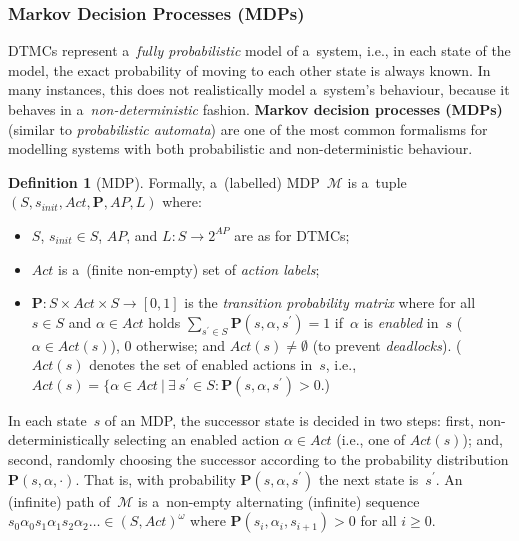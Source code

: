\documentclass[a4paper, 11pt]{article}
\theoremstyle{definition}
\newtheorem{definition}{Definition}[section]
\begin{document}
\subsubsection{Markov Decision Processes (MDPs)}

DTMCs represent a~\emph{fully probabilistic} model of a~system, i.e., in
each state of the model, the exact probability of moving to each other
state is always known. In many instances, this does not realistically model
a~system's behaviour, because it behaves in a~\emph{non-deterministic}
fashion. \textbf{Markov decision processes (MDPs)} (similar to
\emph{probabilistic automata}) are one of the most common formalisms for
modelling systems with both probabilistic and non-deterministic behaviour.

\begin{definition}[MDP]
Formally, a~(labelled) MDP~$ \mathcal{M} $ is a~tuple $ (S, s_{init},
Act, \boldsymbol{P}, AP, L) $ where:
\begin{itemize}
    \item
        $ S $, $ s_{init} \in S $, $ AP $, and $ L : S \rightarrow 2^{AP} $
        are as for DTMCs;

    \item
        $ Act $ is a~(finite non-empty) set of \emph{action labels};

    \item
        $ \boldsymbol{P} : S \times Act \times S \rightarrow [0, 1] $ is
        the \emph{transition probability matrix} where for all $ s \in S $
        and $ \alpha \in Act $ holds $ \sum_{s^\prime \in S}
        \boldsymbol{P}(s, \alpha, s^\prime) = 1 $ if~$ \alpha $ is
        \emph{enabled} in~$ s $ ($ \alpha \in Act(s) $), 0 otherwise;
        and $ Act(s) \neq \emptyset $ (to prevent \emph{deadlocks}).
        ($ Act(s) $ denotes the set of enabled actions in~$ s $,
        i.e., $ Act(s) = \{\alpha \in Act\ |\ \exists\ s^\prime \in S :
        \boldsymbol{P}(s, \alpha, s^\prime) > 0 $.)
\end{itemize}
\end{definition}

In each state~$ s $ of an MDP, the successor state is decided in two
steps: first, non-deterministically selecting an enabled action $ \alpha
\in Act $ (i.e., one of $ Act(s) $); and, second, randomly choosing the
successor according  to the probability distribution $ \boldsymbol{P}(s,
\alpha, \cdot) $. That is, with probability $ \boldsymbol{P}(s, \alpha,
s^\prime) $ the next state is~$ s^\prime $. An (infinite) path
of~$ \mathcal{M} $ is a~non-empty alternating (infinite) sequence $ s_0
\alpha_0 s_1 \alpha_1 s_2 \alpha_2 \ldots \in (S, Act)^\omega $ where
$ \boldsymbol{P}(s_i, \alpha_i, s_{i + 1})> 0 $ for all $ i \geq 0 $.
\end{document}
